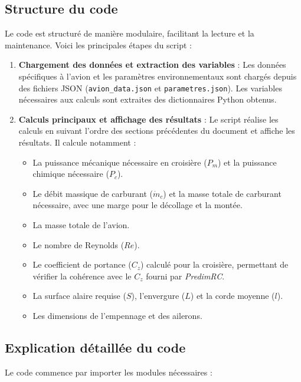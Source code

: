 \documentclass[12pt,a4paper]{article}
\begin{document}
\subsection{Structure du code}

Le code est structuré de manière modulaire, facilitant la lecture et la maintenance. Voici les principales étapes du script :

\begin{enumerate}[label=\arabic*.]
    \item \textbf{Chargement des données et extraction des variables} : Les données spécifiques à l'avion et les paramètres environnementaux sont chargés depuis des fichiers JSON (\texttt{avion\_data.json} et \texttt{parametres.json}). Les variables nécessaires aux calculs sont extraites des dictionnaires Python obtenus.
    
    \item \textbf{Calculs principaux et affichage des résultats} : Le script réalise les calculs en suivant l'ordre des sections précédentes du document et affiche les résultats. Il calcule notamment :
    \begin{itemize}
        \item La puissance mécanique nécessaire en croisière ($P_m$) et la puissance chimique nécessaire ($P_c$).
        \item Le débit massique de carburant ($\dot{m}_c$) et la masse totale de carburant nécessaire, avec une marge pour le décollage et la montée.
        \item La masse totale de l'avion.
        \item Le nombre de Reynolds ($Re$).
        \item Le coefficient de portance ($C_z$) calculé pour la croisière, permettant de vérifier la cohérence avec le $C_z$ fourni par \textit{PredimRC}.
        \item La surface alaire requise ($S$), l'envergure ($L$) et la corde moyenne ($l$).
        \item Les dimensions de l'empennage et des ailerons.
    \end{itemize}
\end{enumerate}

\subsection{Explication détaillée du code}

Le code commence par importer les modules nécessaires :
\end{document}

